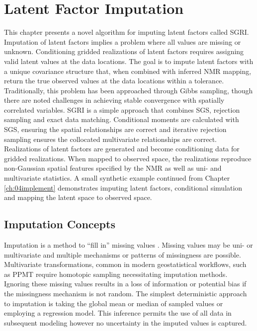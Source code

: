 
\chapter{Latent Factor Imputation}
\label{ch:05impute}

This chapter presents a novel algorithm for imputing latent factors called \gls{SGRI}. Imputation of latent factors implies a problem where all values are missing or unknown. Conditioning gridded realizations of latent factors requires assigning valid latent values at the data locations. The goal is to impute latent factors with a unique covariance structure that, when combined with inferred \gls{NMR} mapping, return the true observed values at the data locations within a tolerance. Traditionally, this problem has been approached through Gibbs sampling, though there are noted challenges in achieving stable convergence with spatially correlated variables. \gls{SGRI} is a simple approach that combines \gls{SGS}, rejection sampling and exact data matching. Conditional moments are calculated with \gls{SGS}, ensuring the spatial relationships are correct and iterative rejection sampling ensures the collocated multivariate relationships are correct. Realizations of latent factors are generated and become conditioning data for gridded realizations. When mapped to observed space, the realizations reproduce non-Gaussian spatial features specified by the \gls{NMR} as well as uni- and multivariate statistics. A small synthetic example continued from Chapter \ref{ch:04implement} demonstrates imputing latent factors, conditional simulation and mapping the latent space to observed space.

\FloatBarrier
\section{Imputation Concepts}
\label{sec:impute}

Imputation is a method to ``fill in'' missing values \citep{little2019statistical}. Missing values may be uni- or multivariate and multiple mechanisms or patterns of missingness are possible. Multivariate transformations, common in modern geostatistical workflows, such as \gls{PPMT} \citep{barnett2014projection} require homotopic sampling necessitating imputation methods. Ignoring these missing values results in a loss of information or potential bias if the missingness mechanism is not random. The simplest deterministic approach to imputation is taking the global mean or median of sampled values or employing a regression model. This inference permits the use of all data in subsequent modeling however no uncertainty in the imputed values is captured.

